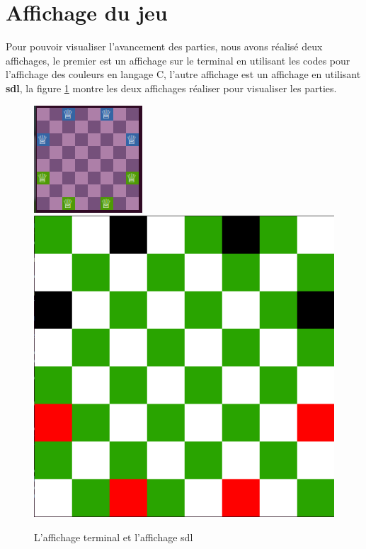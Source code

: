 \documentclass[11pt]{article}
\begin{document}
    \section{Affichage du jeu}
        Pour pouvoir visualiser l'avancement des parties, nous avons réalisé deux affichages, le premier est un affichage sur le terminal en utilisant les codes pour l'affichage des couleurs en langage C, l'autre affichage est un affichage en utilisant \textbf{sdl}, la figure \ref{fig:display} montre les deux affichages réaliser pour visualiser les parties.
        \begin{figure}[h]
    \centering
    \vspace{.5cm}
    \includegraphics[scale=0.85]{affichage_terminal.png}\quad
    \includegraphics[scale=0.2]{affichage_sdl.png}
    \caption{L'affichage terminal et l'affichage sdl }
    \label{fig:display}
\end{figure}\\
\end{document}
